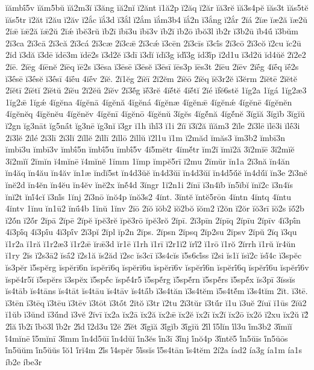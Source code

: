 {ĭămbī́5v
ĭăm5bŭ
ĭă2m3ĭ
ĭ3ăng
ĭă2nĭ
ĭ2ănt
ĭ1ă2p
ĭ2ăq
ĭ2ăr
ĭă3rĕ
ĭă3s4pĕ
ĭăs3t
ĭăs5tĕ
ĭăs5tr
ĭ2ăt
ĭ2ău
ĭ2ăv
ĭ2ắc
ĭắ3d
ĭ3ắl
ĭ2ắm
ĭắm3b4
ĭắ2n
ĭ3ắng
ĭ2ắr
2ĭá
2ĭæ
ĭæ2ă
ĭæ2ŭ
2ĭǣ
ĭǣ2ă
ĭǣ2ŭ
2ĭǽ
ĭbĕ3rŭ
ĭb2ī
ĭbī3u
ĭbī3v
ĭb2ĭ
ĭb2ō
ĭbŏ3l
ĭb2r
ĭ3b2ū
ĭb4ū́
ĭ3bŭm
2ĭ3ca
2ĭ3cā
2ĭ3că
2ĭ3cá
2ĭ3cæ
2ĭ3cǣ
2ĭ3cǽ
ĭ3cēn
2ĭ3cīs
ĭ3cī́s
2ĭ3cō
2ĭ3cŏ
ĭ2cu
ĭc2ū
2ĭd
ĭ3dă
ĭ3dē
ĭdē3m
ĭdē2s
ĭ3d2ĕ
ĭ3dī
ĭ3dĭ
ĭdĭ3g
ĭdĭ́3g
ĭd3ĭ́p
ĭ2d1u
ĭ3d2ŭ
ĭd4ŭĕ
2ĭ2e2
2ĭē.
2ĭēg
4ĭēnĕ
2ĭēq
ĭē2s
ĭ3ēsa
ĭ3ēsē
ĭ3ēsĕ
ĭ3ēsī
ĭēs3p
ĭēs3t
2ĭēu
2ĭēv
2ĭḗg
4ĭḗq
ĭḗ2s
ĭ3ḗsē
ĭ3ḗsĕ
ĭ3ḗsī
4ĭḗu
4ĭḗv
2ĭĕ.
2ĭ1ĕg
2ĭĕī
2ĭ2ĕm
2ĭĕō
2ĭĕq
ĭĕ3r2ĕ
ĭ3ĕrm
2ĭĕtē
2ĭĕtĕ
2ĭĕtī
2ĭĕtĭ
2ĭĕtŭ
2ĭĕu
2ĭ2ĕŭ
2ĭĕv
2ĭ3ĕ́g
ĭĕ́3rĕ
4ĭĕ́tĕ
4ĭĕ́tĭ
2ĭé
ĭfĕ6stĕ
1ĭg2a
1ĭgá
1ĭg2æ3
1ĭg2ǣ
1ĭgǽ
4ĭgĕna
4ĭgĕnā
4ĭgĕnă
4ĭgĕná
4ĭgĕnæ
4ĭgĕnǣ
4ĭgĕnǽ
4ĭgĕnē
4ĭgĕnĕn
4ĭgĕnĕq
4ĭgĕnĕu
4ĭgĕnĕv
4ĭgĕnī
4ĭgĕnō
4ĭgĕnŭ
3ĭgĕs
4ĭgĕ́nă
4ĭgĕ́nĕ
3ĭgĭă
3ĭgĭb
3ĭgĭŭ
ĭ2gn
ĭg3nāt
ĭg5nā́t
ĭg3nē
ĭg3nĭ
ĭ3gr
ĭ1h
ĭhĭ́3
ĭ1i
2ĭī
ĭ3ĭ2ă
ĭĭăm3
2ĭle
2ĭ3lē
ĭlē3i
ĭlḗ3i
2ĭ3lĕ
2ĭlé
2ĭ3lī
2ĭ3lĭ
2ĭllĕ
2ĭllī
2ĭllō
2ĭllŭ
ĭ2l1u
ĭ1m
ĭ2măd
ĭmăs3
ĭm3b2
ĭmbī3n
ĭmbī3u
ĭmbī3v
ĭmbī́5n
ĭmbī́5u
ĭmbī́5v
4ĭ5mĕtr
4ĭmĕ́tr
ĭm2ĭ
ĭmĭ2ă
3ĭ2mĭē
3ĭ2mĭĕ
3ĭ2mĭĭ
2ĭmĭn
ĭ4mĭnē
ĭ4mĭnĕ
1ĭmm
1ĭmp
ĭmpĕ5rī
ĭ2mu
2ĭmŭr
ĭn1a
2ĭ3nă
ĭn4ăn
ĭn4ăq
ĭn4ău
ĭn4ăv
ĭn1æ
ĭndĭ5st
ĭn4d3ŭĕ
ĭn4d3ŭī
ĭn4d3ŭĭ
ĭn4d5ŭ́ĕ
ĭn4dŭ́ĭ
ĭn3e
2ĭ3nĕ
ĭnĕ2d
ĭn4ĕn
ĭn4ĕu
ĭn4ĕv
ĭnĕ2x
ĭnĕ́4d
3ĭngr
1ĭ2n1i
2ĭnī
ĭ3n4ĭb
ĭn5ĭbĭ
ĭnĭ2c
ĭ3n4ĭs
ĭnĭ2t
ĭnĭ́4cĭ
ĭ3nĭ́s
1ĭnj
2ĭ3nō
ĭnŏ4p
ĭnŏ3s2
4ĭnt.
3ĭntĕ
ĭntĕ5rōn
4ĭntn
4ĭntq
4ĭntu
4ĭntv
1ĭnu
ĭn1ū2
ĭnū́4b
1ĭnŭ
1ĭnv
2ĭō
2ĭŏ
ĭŏb2
ĭŏ2bŏ
ĭŏm2
ĭ2ŏn
ĭ2ŏr
ĭŏ3rī
ĭŏ2s
ĭŏ́2b
ĭ2ŏ́n
ĭ2ŏ́r
2ĭpā
2ĭpē
2ĭpĕ
ĭpĕ3rĕ
ĭpĕ3rō
ĭpĕ3rŏ
2ĭpī.
2ĭ3pīn
2ĭpīq
2ĭpīu
2ĭpīv
4ĭ3pī́n
4ĭ3pī́q
4ĭ3pī́u
4ĭ3pī́v
2ĭ3pĭ
2ĭpl
ĭp2n
2ĭps.
2ĭpsn
2ĭpsq
2ĭp2su
2ĭpsv
2ĭpŭ
2ĭq
ĭ3qu
ĭ1r2a
ĭ1ră
ĭ1r2æ3
ĭ1r2ǣ
ĭrǣ3d
ĭr1ē
ĭ1rh
ĭ1rī
ĭ2r1ĭ2
ĭrĭ́2
ĭ1rō
ĭ1rŏ
2ĭrrh
ĭ1rŭ
ĭr4ŭn
ĭ1ry
2ĭs
ĭ2s3ā2
ĭsā́2
ĭ2s1ă
ĭs2ăd
ĭ2sc
ĭs3cī
ĭ3s4cĭs
ĭ5s6cĭ́ss
ĭ2si
ĭs1ĭ
ĭsĭ2c
ĭsĭ́4c
ĭ3spĕc
ĭs3pĕr
ĭ5spĕrg
ĭspĕrī6n
ĭspĕrī6q
ĭspĕrī6u
ĭspĕrī6v
ĭspĕrī́6n
ĭspĕrī́6q
ĭspĕrī́6u
ĭspĕrī́6v
ĭspĕ4r5ĭ
ĭ5spĕrs
ĭ3spĕx
ĭ5spĕ́c
ĭspĕ́4r5
ĭ5spĕ́rg
ĭ5spĕ́rn
ĭ5spĕ́rs
ĭ5spĕ́x
ĭs3pī
3ĭssĭs
ĭs4tāb
ĭs4tāns
ĭs4tāt
ĭs4tāu
ĭs4tāv
ĭs4tā́b
ĭ3s4tăn
ĭ3s4tĕm
ĭ5s4tĕ́m
ĭ3s4tĭm
2ĭt.
ĭ3tē.
ĭ3tēn
ĭ3tēq
ĭ3tēu
ĭ3tēv
ĭ3tōt
ĭ3tṓt
2ĭtŏ
ĭ3tr
ĭ2tu
2ĭ3tŭr
ĭ3tŭ́r
ĭ1u
ĭ3uĕ
2ĭuī
ĭ1ūs
2ĭŭ2
ĭ1ŭb
ĭ3ŭnd
ĭ3ŭ́nd
ĭ3vĕ
2ĭvī
ĭx2a
ĭx2ā
ĭx2ă
ĭx2ǣ
ĭx2ĕ
ĭx2ī
ĭx2ĭ
ĭx2ō
ĭx2ŏ
ĭ2xu
ĭx2ŭ
ĭ2́
2ĭ́ă
ĭ́b2ī
ĭ́bŏ3l
ĭ́b2r
2ĭ́d
ĭ́2d3u
ĭ́2ĕ
2ĭ́ĕt
3ĭ́gĭă
3ĭ́gĭb
3ĭ́gĭŭ
2ĭ́l
ĭ́5lĭn
ĭ́l3u
ĭ́m3b2
3ĭ́mĭĭ
ĭ́4mĭnē
ĭ́5mĭnī
3ĭ́mm
ĭ́n4d5ŭī
ĭ́n4dŭĭ
ĭ́n3ĕs
ĭ́n3ī
3ĭ́nj
ĭ́nŏ4p
3ĭ́ntĕ5
ĭ́n5ŭīs
ĭ́n5ŭōs
ĭ́n5ŭŭm
ĭ́n5ŭŭs
ĭ́ŏ1
ĭ́rĭ4m
2ĭ́s
ĭ́4spĕr
5ĭ́ssĭs
ĭ́5s4tān
ĭ́s4tĕm
2í2a
íad2
ía3g
ía1m
ía1s
íb2e
íbe3r
}
